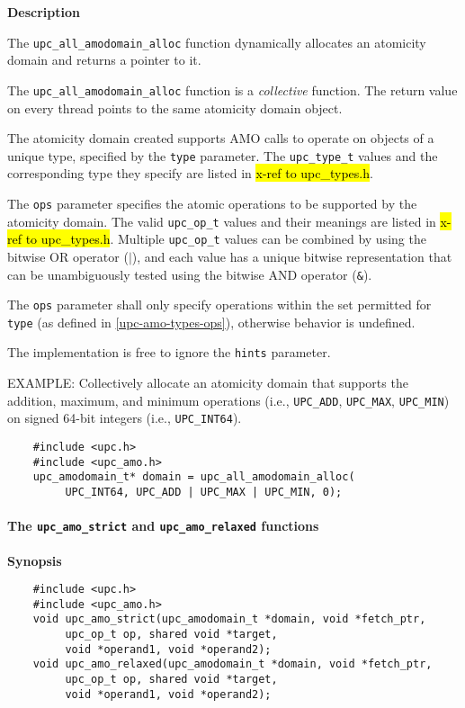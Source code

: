 {\bf Description}

\np The {\tt upc\_all\_amodomain\_alloc} function dynamically allocates an
    atomicity domain and returns a pointer to it.

\np The {\tt upc\_all\_amodomain\_alloc} function is a {\em collective} function.
    The return value on every thread points to the same atomicity domain
    object.

\np The atomicity domain created supports AMO calls to operate on objects of a
    unique type, specified by the {\tt type} parameter.  The {\tt upc\_type\_t}
    values and the corresponding type they specify are listed in
    \hl{x-ref to upc\_types.h}.

\np The {\tt ops} parameter specifies the atomic operations to be supported by
    the atomicity domain.  The valid {\tt upc\_op\_t} values and their meanings
    are listed in \hl{x-ref to upc\_types.h}.  Multiple {\tt upc\_op\_t} values
    can be combined by using the bitwise OR operator ($|$), and each value has
    a unique bitwise representation that can be unambiguously tested using the
    bitwise AND operator ({\tt \&}).

\np The {\tt ops} parameter shall only specify operations within the set
    permitted for {\tt type} (as defined in \ref{upc-amo-types-ops}), otherwise
    behavior is undefined.

\np The implementation is free to ignore the {\tt hints} parameter.

\np EXAMPLE: Collectively allocate an atomicity domain that supports the
    addition, maximum, and minimum operations (i.e., {\tt UPC\_ADD},
    {\tt UPC\_MAX}, {\tt UPC\_MIN}) on signed 64-bit integers (i.e.,
    {\tt UPC\_INT64}).
\begin{verbatim}
    #include <upc.h>
    #include <upc_amo.h>
    upc_amodomain_t* domain = upc_all_amodomain_alloc(
         UPC_INT64, UPC_ADD | UPC_MAX | UPC_MIN, 0);
\end{verbatim}

\paragraph{The {\tt upc\_amo\_strict} and {\tt upc\_amo\_relaxed} functions}

{\bf Synopsis}

\npf\vspace{-1.8em}
\begin{verbatim}
    #include <upc.h>
    #include <upc_amo.h>
    void upc_amo_strict(upc_amodomain_t *domain, void *fetch_ptr,
         upc_op_t op, shared void *target,
         void *operand1, void *operand2);
    void upc_amo_relaxed(upc_amodomain_t *domain, void *fetch_ptr,
         upc_op_t op, shared void *target,
         void *operand1, void *operand2);
\end{verbatim}

